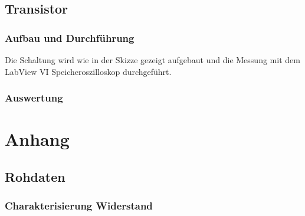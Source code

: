 \documentclass[12pt,twoside,a4paper]{scrartcl}
\begin{document}
	\subsection{Transistor}
		\subsubsection{Aufbau und Durchführung}
			Die Schaltung wird wie in der Skizze gezeigt aufgebaut und die Messung mit dem LabView VI Speicheroszilloskop durchgeführt.

		\subsubsection{Auswertung}



\section{Anhang}
	\subsection{Rohdaten}
		\subsubsection{Charakterisierung Widerstand}
		\label{Daten::Widerstand}
\end{document}
